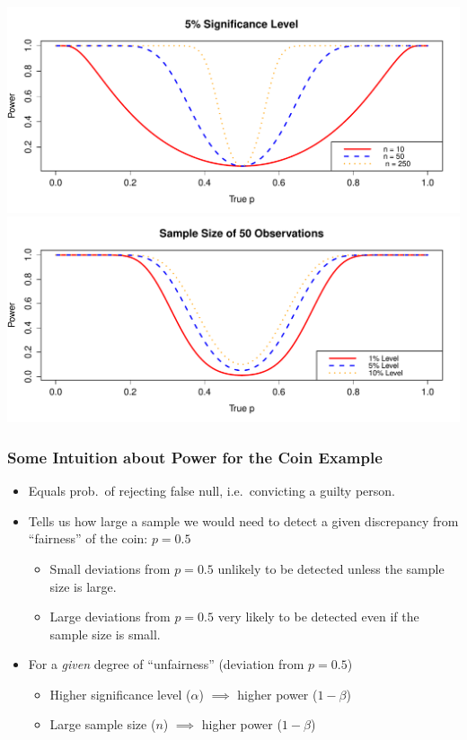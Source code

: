 \documentclass[handout]{beamer}
\begin{document}
\begin{frame}
\begin{center}
	\includegraphics[scale=0.37]{./images/power_change_n}\\
	\includegraphics[scale=0.37]{./images/power_change_a}
\end{center}
\end{frame}
\begin{frame}
\frametitle{Some Intuition about Power for the Coin Example}
\small
	\begin{itemize}
	\item Equals prob.\ of rejecting false null, i.e.\ convicting a guilty person.
	\item Tells us how large a sample we would need to detect a given discrepancy from ``fairness'' of the coin: $p = 0.5$
		\begin{itemize}
			\item Small deviations from $p=0.5$ unlikely to be detected unless the sample size is large.
			\item Large deviations from $p=0.5$ very likely to be detected even if the sample size is small.
		\end{itemize}
		\item For a \emph{given} degree of ``unfairness'' (deviation from $p = 0.5$)
			\begin{itemize}
				\item Higher significance level ($\alpha$) $\implies$ higher power ($1-\beta$)
				\item Large sample size ($n$) $\implies$ higher power ($1-\beta$)
			\end{itemize}
	\end{itemize}
\end{frame}
\end{document}

